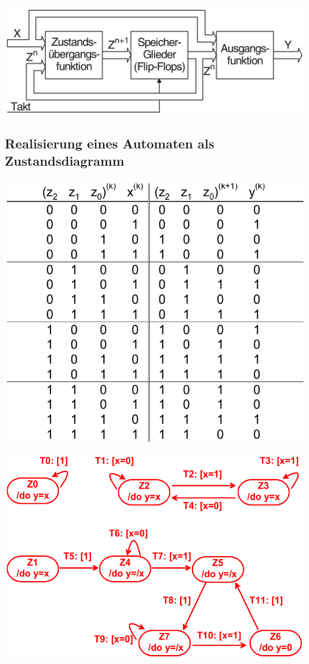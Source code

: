 \documentclass[a5paper,12pt,twoside]{scrartcl}
\begin{document}
{\centering%
  \includegraphics[width=.5\textwidth]{Mealy_Automat}
  \par%
}

\subsection{Realisierung eines Automaten als Zustandsdiagramm}

\begin{minipage}{.48\linewidth}
  \includegraphics[width=\textwidth]{Automat_Tabelle}
\end{minipage}\hfill\vline\hfill%
\begin{minipage}{.48\linewidth}
  \includegraphics[width=\textwidth]{Automat_UML}
\end{minipage}
\end{document}
